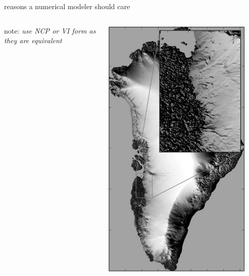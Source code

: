 \documentclass[10pt,hyperref,dvipsnames]{beamer}
\begin{document}
\begin{frame}{reasons a numerical modeler should care}
\begin{columns}
\begin{column}{0.65\textwidth}
\medskip
\scriptsize note: \emph{use NCP or VI form as they are equivalent}
\end{column}
\begin{column}{0.35\textwidth}
\hfill \includegraphics[width=0.9\textwidth]{figs/GISBueler2016.png}
\end{column}
\end{columns}
\end{frame}
\end{document}

